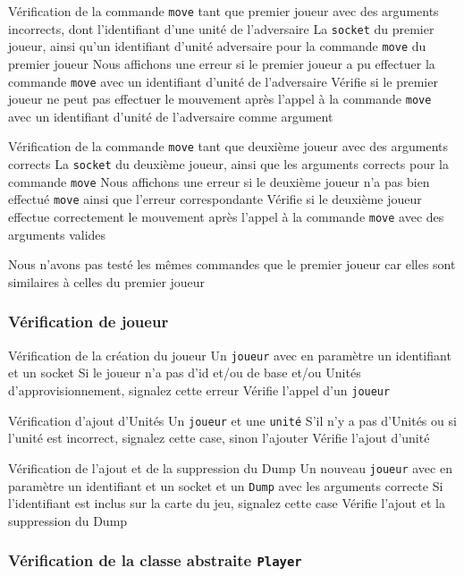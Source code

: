 \mytest
{Vérification de la commande {\tt move} tant que premier joueur avec des arguments incorrects, dont l'identifiant d'une unité de l'adversaire}
{La {\tt socket} du premier joueur, ainsi qu'un identifiant d'unité adversaire pour la commande {\tt move} du premier joueur}
{Nous affichons une erreur si le premier joueur a pu effectuer la commande {\tt move} avec un identifiant d'unité de l'adversaire}
{Vérifie si le premier joueur ne peut pas effectuer le mouvement après l'appel à la commande {\tt move} avec un identifiant d'unité de l'adversaire comme argument}

\mytest
{Vérification de la commande {\tt move} tant que deuxième joueur avec des arguments corrects}
{La {\tt socket} du deuxième joueur, ainsi que les arguments corrects pour la commande {\tt move}}
{Nous affichons une erreur si le deuxième joueur n'a pas bien effectué {\tt move} ainsi que l'erreur correspondante}
{Vérifie si le deuxième joueur effectue correctement le mouvement après l'appel à la commande {\tt move} avec des arguments valides}

Nous n'avons pas testé les mêmes commandes que le premier joueur car elles sont similaires à celles du premier joueur



\subsubsection{Vérification de joueur}

\mytest
{Vérification de la création du joueur }
{Un  {\tt joueur} avec en paramètre un identifiant et un socket}
{Si le joueur n'a pas d'id et/ou de base et/ou Unités d'approvisionnement, signalez cette erreur}
{Vérifie l'appel d'un {\tt joueur}}


\mytest
{Vérification d'ajout d'Unités }
{Un {\tt joueur} et une {\tt unité}}
{S'il n'y a pas d'Unités ou si l'unité est incorrect, signalez cette case, sinon l'ajouter}
{Vérifie l'ajout d'unité}


\mytest
{Vérification de l'ajout et de la suppression du Dump }
{Un nouveau {\tt joueur} avec en paramètre un identifiant et un socket et un {\tt Dump} avec les arguments correcte}
{Si l'identifiant est inclus sur la carte du jeu, signalez cette case}
{Vérifie l'ajout et la suppression du Dump}


\subsubsection{Vérification de la classe abstraite {\tt Player}}

